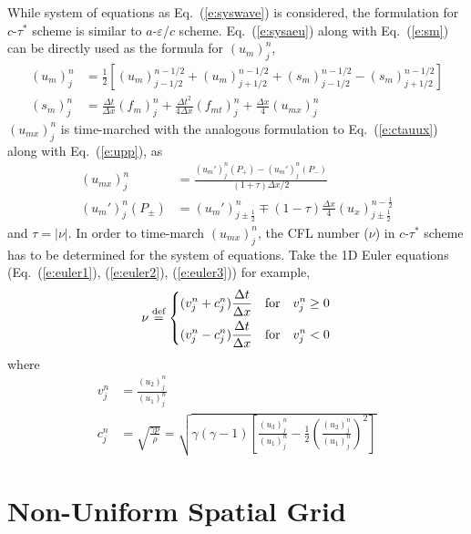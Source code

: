 \documentclass{turgon}
\begin{document}
While system of equations as Eq.~(\ref{e:syswave}) is considered, the
formulation for $c$-$\tau^*$ scheme is similar to $a$-$\varepsilon$/$c$ scheme.
Eq.~(\ref{e:sysaeu}) along with Eq.~(\ref{e:sm}) can be directly used as the
formula for $(u_m)_j^n$,
\begin{align*}
  (u_m)_j^n &= \frac{1}{2}\left[
      (u_m)_{j-1/2}^{n-1/2} + (u_m)_{j+1/2}^{n-1/2}
    + (s_m)_{j-1/2}^{n-1/2} - (s_m)_{j+1/2}^{n-1/2}
    \right] \\
  (s_m)_j^n &=
      \frac{\Delta t}  {\Delta x} (f_m)_j^n
    + \frac{\Delta t^2}{4\Delta x}(f_{mt})_j^n
    + \frac{\Delta x}  {4}        (u_{mx})_j^n
\end{align*}
$(u_{mx})_j^n$ is time-marched with the analogous formulation to
Eq.~(\ref{e:ctauux}) along with Eq.~(\ref{e:upp}), as
\begin{align}
  (u_{mx})_j^n &=
    \frac{(u_m')_j^n(P_+)-(u_m')_j^n(P_-)}
         {(1+\tau)\Delta x/2} \\
  (u_m')_j^n(P_{\pm}) &=
        (u_m')_{j\pm\frac{1}{2}}^n
    \mp (1-\tau)\frac{\Delta x}{4}(u_x)_{j\pm\frac{1}{2}}^{n-\frac{1}{2}}
\end{align}
and $\tau=|\nu|$.  In order to time-march $(u_{mx})_j^n$, the CFL number
($\nu$) in $c$-$\tau^*$ scheme has to be determined for the system of
equations.  Take the 1D Euler equations (Eq.~(\ref{e:euler1}),
(\ref{e:euler2}), (\ref{e:euler3})) for example,
\begin{align}
  \nu \defeq \left\{\begin{aligned}
    &(v_j^n+c_j^n)\frac{\Delta t}{\Delta x}
      \quad\text{for}\quad v_j^n \ge 0 \\
    &(v_j^n-c_j^n)\frac{\Delta t}{\Delta x}
      \quad\text{for}\quad v_j^n < 0 \\
  \end{aligned} \right.
  \label{e:eulernu}
\end{align}
where
\begin{align}
  v_j^n &=
    \frac{(u_2)_j^n}{(u_1)_j^n}
  \label{e:eulerv} \\
  c_j^n &= \sqrt{\frac{\gamma p}{\rho}} =
    \sqrt{\gamma(\gamma-1)
          \left[
              \frac{(u_3)_j^n}{(u_1)_j^n}
            - \frac{1}{2}\left(\frac{(u_2)_j^n}{(u_1)_j^n}\right)^2
          \right]}
  \label{e:eulerc}
\end{align}

\section{Non-Uniform Spatial Grid}
\label{s:nuni}
\end{document}
